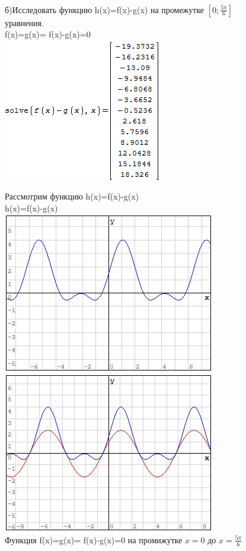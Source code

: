 \documentclass[russian,utf8,nocolumnxxxi,nocolumnxxxii]{eskdtext}
\begin{document}
{\\б)Исследовать функцию h(x)=f(x)-g(x) на промежутке $[0;\frac{5\pi}{6}]$\\
{ уравнения.}
\\ f(x)=g(x)= f(x)-g(x)=0
\\\includegraphics{2019-01-09_02-19-12}
\newpage

\par
\normalsize
Рассмотрим функцию h(x)=f(x)-g(x)
\\ h(x)=f(x)-g(x)
\\\includegraphics[scale=0.95]{h(x)=f(x)-g(x)}\includegraphics[scale=0.95]{f(x)-f(x)+f(x)}
\\Функция f(x)=g(x)= f(x)-g(x)=0 на промижутке $x=0$ до $x=\frac{5\pi}{6}$ \\
\begin{tikzpicture}


\end{tikzpicture}}
\end{document}
